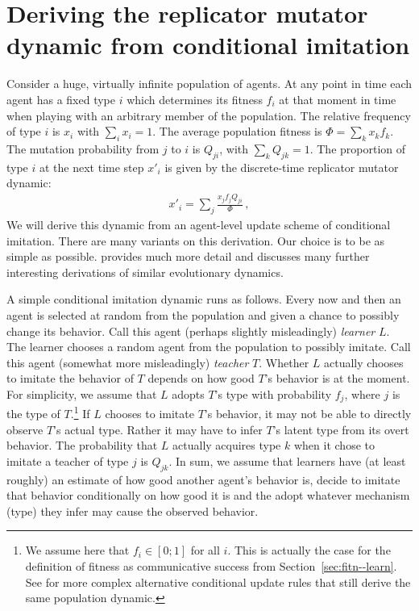 \documentclass[a4paper, 11pt]{article}
\theoremstyle{Satz}
\begin{document}
\section{Deriving the replicator mutator dynamic from conditional imitation}
\label{sec:deriv-repl-mutat}

Consider a huge, virtually infinite population of agents. At any point in time each agent has a
fixed type $i$ which determines its fitness $f_i$ at that moment in time when playing with an
arbitrary member of the population. The relative frequency of type $i$ is $x_i$ with
$\sum_i x_i = 1$. The average population fitness is $\Phi = \sum_k x_k f_k$. The mutation
probability from $j$ to $i$ is $Q_{ji}$, with $\sum_k Q_{jk} = 1$. The proportion of type $i$
at the next time step $x'_i$ is given by the discrete-time replicator mutator dynamic:
\begin{align}
  \label{eq:RMD_discrete_repeated}
  x'_i = \sum_j \frac{x_jf_j Q_{ji}}{\Phi}\,,
\end{align}
We will derive this dynamic from an agent-level update scheme of conditional imitation. There
are many variants on this derivation. Our choice is to be as simple as
possible. \citet{Sandholm2010:Population-Game} provides much more detail and discusses many
further interesting derivations of similar evolutionary dynamics.

A simple conditional imitation dynamic runs as follows. Every now and then an agent is selected
at random from the population and given a chance to possibly change its behavior. Call this
agent (perhaps slightly misleadingly) \emph{learner} $L$. The learner chooses a random agent
from the population to possibly imitate. Call this agent (somewhat more misleadingly)
\emph{teacher} $T$. Whether $L$ actually chooses to imitate the behavior of $T$ depends on how
good $T$'s behavior is at the moment. For simplicity, we assume that $L$ adopts $T$'s type with
probability $f_j$, where $j$ is the type of $T$.\footnote{We assume here that $f_i \in [0;1]$
  for all $i$. This is actually the case for the definition of fitness as communicative success
  from Section~\ref{sec:fitn--learn}. See \citet{Sandholm2010:Population-Game} for more complex
  alternative conditional update rules that still derive the same population dynamic.}  If $L$
chooses to imitate $T$'s behavior, it may not be able to directly observe $T$'s actual
type. Rather it may have to infer $T$'s latent type from its overt behavior. The probability
that $L$ actually acquires type $k$ when it chose to imitate a teacher of type $j$ is
$Q_{jk}$. In sum, we assume that learners have (at least roughly) an estimate of how good
another agent's behavior is, decide to imitate that behavior conditionally on how good it is
and the adopt whatever mechanism (type) they infer may cause the observed behavior.
\end{document}
